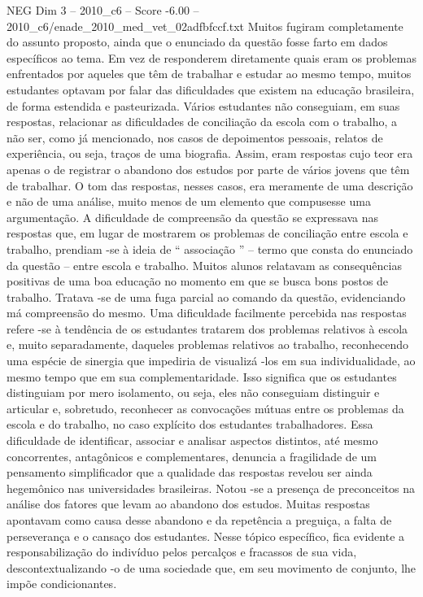 \begin{textsample}{NEG Dim 3 – 2010\_c6 – Score -6.00 – 2010\_c6/enade\_2010\_med\_vet\_02adfbfccf.txt}
Muitos fugiram completamente do assunto proposto, ainda que o enunciado da questão fosse farto em dados específicos ao tema.
Em vez de responderem diretamente quais eram os problemas enfrentados por aqueles que têm de trabalhar e estudar ao mesmo tempo, muitos estudantes optavam por falar das dificuldades que existem na educação brasileira, de forma estendida e pasteurizada.
Vários estudantes não conseguiam, em suas respostas, relacionar as dificuldades de conciliação da escola com o trabalho, a não ser, como já mencionado, nos casos de depoimentos pessoais, relatos de experiência, ou seja, traços de uma biografia.
Assim, eram respostas cujo teor era apenas o de registrar o abandono dos estudos por parte de vários jovens que têm de trabalhar.
O tom das respostas, nesses casos, era meramente de uma descrição e não de uma análise, muito menos de um elemento que compusesse uma argumentação.
A dificuldade de compreensão da questão se expressava nas respostas que, em lugar de mostrarem os problemas de conciliação entre escola e trabalho, prendiam -se à ideia de “ associação ” – termo que consta do enunciado da questão – entre escola e trabalho.
Muitos alunos relatavam as consequências positivas de uma boa educação no momento em que se busca bons postos de trabalho.
Tratava -se de uma fuga parcial ao comando da questão, evidenciando má compreensão do mesmo.
Uma dificuldade facilmente percebida nas respostas refere -se à tendência de os estudantes tratarem dos problemas relativos à escola e, muito separadamente, daqueles problemas relativos ao trabalho, reconhecendo uma espécie de sinergia que impediria de visualizá -los em sua individualidade, ao mesmo tempo que em sua complementaridade.
Isso significa que os estudantes distinguiam por mero isolamento, ou seja, eles não conseguiam distinguir e articular e, sobretudo, reconhecer as convocações mútuas entre os problemas da escola e do trabalho, no caso explícito dos estudantes trabalhadores.
Essa dificuldade de identificar, associar e analisar aspectos distintos, até mesmo concorrentes, antagônicos e complementares, denuncia a fragilidade de um pensamento simplificador que a qualidade das respostas revelou ser ainda hegemônico nas universidades brasileiras.
Notou -se a presença de preconceitos na análise dos fatores que levam ao abandono dos estudos.
Muitas respostas apontavam como causa desse abandono e da repetência a preguiça, a falta de perseverança e o cansaço dos estudantes.
Nesse tópico específico, fica evidente a responsabilização do indivíduo pelos percalços e fracassos de sua vida, descontextualizando -o de uma sociedade que, em seu movimento de conjunto, lhe impõe condicionantes.

\end{textsample}
